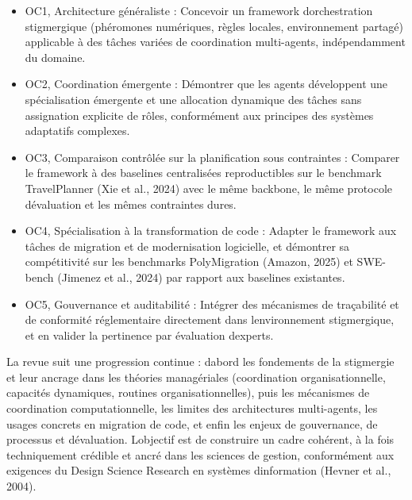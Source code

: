 \begin{itemize}
\tightlist
\item
  OC1, Architecture généraliste : Concevoir un framework
  d\textquotesingle orchestration stigmergique (phéromones numériques,
  règles locales, environnement partagé) applicable à des tâches
  variées de coordination multi-agents, indépendamment du domaine.
\item
  OC2, Coordination émergente : Démontrer que les agents développent
  une spécialisation émergente et une allocation dynamique des tâches
  sans assignation explicite de rôles, conformément aux principes
  des systèmes adaptatifs complexes.
\item
  OC3, Comparaison contrôlée sur la planification sous contraintes :
  Comparer le framework à des baselines centralisées reproductibles sur
  le benchmark TravelPlanner (Xie et al., 2024) avec le même backbone,
  le même protocole d\textquotesingle évaluation et les mêmes
  contraintes dures.
\item
  OC4, Spécialisation à la transformation de code : Adapter le
  framework aux tâches de migration et de modernisation logicielle, et
  démontrer sa compétitivité sur les benchmarks PolyMigration (Amazon,
  2025) et SWE-bench (Jimenez et al., 2024) par rapport aux baselines
  existantes.
\item
  OC5, Gouvernance et auditabilité : Intégrer des mécanismes de
  traçabilité et de conformité réglementaire directement dans
  l\textquotesingle environnement stigmergique, et en valider la
  pertinence par évaluation d\textquotesingle experts.
\end{itemize}

La revue suit une progression continue : d\textquotesingle abord les
fondements de la stigmergie et leur ancrage dans les théories
managériales (coordination organisationnelle, capacités dynamiques,
routines organisationnelles), puis les mécanismes de coordination
computationnelle, les limites des architectures multi-agents, les usages
concrets en migration de code, et enfin les enjeux de gouvernance, de
processus et d\textquotesingle évaluation. L\textquotesingle objectif est
de construire un cadre cohérent, à la fois techniquement crédible et
ancré dans les sciences de gestion, conformément aux exigences du
Design Science Research en systèmes d\textquotesingle information
(Hevner et al., 2004).
